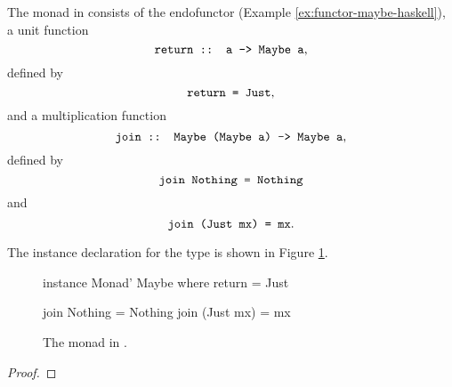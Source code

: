 \begin{example}
  \label{ex:monad-maybe-haskell}

  The  monad in \hask consists of the
   endofunctor (Example
  \ref{ex:functor-maybe-haskell}), a unit function
  \begin{equation*}
    \text{\texttt{return :: a -> Maybe a}}
    \text{,}
  \end{equation*}
  defined by
  \begin{equation}
    \label{eq:maybe-return}
    \text{\texttt{return = Just}}
    \text{,}
  \end{equation}
  and a multiplication function
  \begin{equation*}
    \text{\texttt{join :: Maybe (Maybe a) -> Maybe a}}
    \text{,}
  \end{equation*}
  defined by
  \begin{equation}
    \label{eq:maybe-join-nothing}
    \text{\texttt{join Nothing = Nothing}}
  \end{equation}
  and
  \begin{equation}
    \label{eq:maybe-join-just}
    \text{\texttt{join (Just mx) = mx}}
    \text{.}
  \end{equation}

  The  instance declaration for the
   type is shown in Figure
  \ref{fig:monad-maybe-haskell}.
  \begin{figure}[htbp]
    \begin{codehaskell}
instance Monad' Maybe where
  return = Just

  join Nothing   = Nothing
  join (Just mx) = mx
    \end{codehaskell}
    \caption{The  monad in \hask.}
    \label{fig:monad-maybe-haskell}
  \end{figure}

  \begin{proof}


\end{proof}
\end{example}
